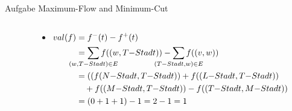 \begin{frame}[allowframebreaks]{Aufgabe \thesection}{Maximum-Flow and Minimum-Cut}
\begin{requirementsnoinc}
\begin{columns}
\begin{column}{0.5\textwidth}
{\begin{minipage}[t]{8cm}
\begin{itemize}
            \end{itemize}
          \end{minipage}
        }
      \end{column}
    \end{columns}
  \end{requirementsnoinc}
  \framebreak
  \begin{solution}
    \begin{columns}
      \begin{column}{0.4\textwidth}
      \end{column}
      \begin{column}{0.6\textwidth}
        \begin{itemize}
          \tiny
          \item $\begin{aligned}[t]\displaystyle val(f) &= f^-(t) - f^+(t)\\
            &= \sum_{\mathclap{\substack{(w, T-Stadt)\in E}}} f((w, T{-}Stadt)) - \sum_{\mathclap{\substack{(T{-}Stadt, w)\in E}}} f((v,w))\\
            &= ((f(N{-}Stadt, T{-}Stadt)) + f((L{-}Stadt, T{-}Stadt)) \\
            &\quad + f((M{-}Stadt, T{-}Stadt)) - f((T{-}Stadt, M{-}Stadt))\\
            &= (0 + 1 + 1 ) - 1 = 2 - 1 = 1\\
          \end{aligned}$
        \end{itemize}
      \end{column}
    \end{columns}
  \end{solution}
  \begin{solution}
    \begin{columns}
      \begin{column}{0.5\textwidth}
      \end{column}
      \begin{column}{0.5\textwidth}
        \resizebox{\textwidth}{!}{
          \begin{minipage}[t]{14cm}

\end{minipage}}
\end{column}
\end{columns}
\end{solution}
\end{frame}
